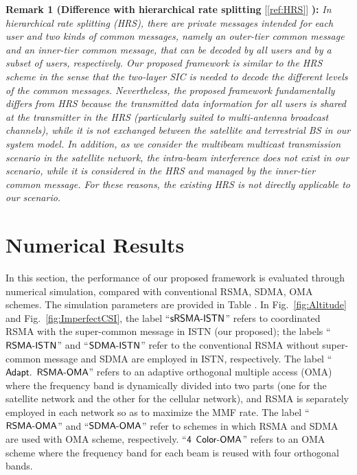 \documentclass[draftclsnofoot, onecolumn, comsoc, 12pt]{IEEEtran}
\begin{document}
 {\bf Remark 1 (Difference with hierarchical rate splitting} \mbox{[\ref{ref:HRS}]}
  {\bf ):}
 \it{
In hierarchical rate splitting (HRS), there are private messages intended for each user and two kinds of common messages, namely an outer-tier common message and an inner-tier common message, that can be decoded by all users and by a subset of users, respectively. 
    Our proposed framework is similar to the HRS scheme in the sense that the two-layer SIC is needed to decode the different levels of the common messages. 
    Nevertheless, the proposed framework fundamentally differs from HRS because the transmitted data information for all users is shared at the transmitter in the HRS (particularly suited to multi-antenna broadcast channels), while it is not exchanged between the satellite and terrestrial BS in our system model. 
    In addition, as we consider the multibeam multicast transmission scenario in the satellite network, the intra-beam interference does not exist in our scenario, while it is considered in the HRS and managed by the inner-tier common message. 
    For these reasons, the existing HRS is not directly applicable to our scenario.
}
\section{Numerical Results}
\rm{In this section, the performance of our proposed framework is evaluated through numerical simulation, compared with conventional RSMA, SDMA, OMA schemes.} 
The simulation parameters are provided in Table \uppercase\expandafter{}.
%
In Fig.~\ref{fig:Altitude} and Fig.~\ref{fig:ImperfectCSI}, the label ``$\sf{sRSMA\mbox{-}ISTN}$'' refers to coordinated RSMA with the super-common message in ISTN (our proposed); the labels ``$\sf{RSMA\mbox{-}ISTN}$'' and ``$\sf{SDMA\mbox{-}ISTN}$'' refer to the conventional RSMA without super-common message and SDMA are employed in ISTN, respectively. 
The label ``$\sf{Adapt.}$ $\sf{RSMA\mbox{-}OMA}$'' refers to an adaptive orthogonal multiple access (OMA) where the frequency band is dynamically divided into two parts (one for the satellite network and the other for the cellular network), and RSMA is separately employed in each network so as to maximize the MMF rate. 
The label ``$\sf{RSMA\mbox{-}OMA}$'' and ``$\sf{SDMA\mbox{-}OMA}$'' refer to schemes in which RSMA and SDMA are used with OMA scheme, respectively.
``$\sf{4}$ $\sf{Color\mbox{-}OMA}$'' refers to an OMA scheme where  the frequency band for each beam is reused with four orthogonal bands.
\end{document}
